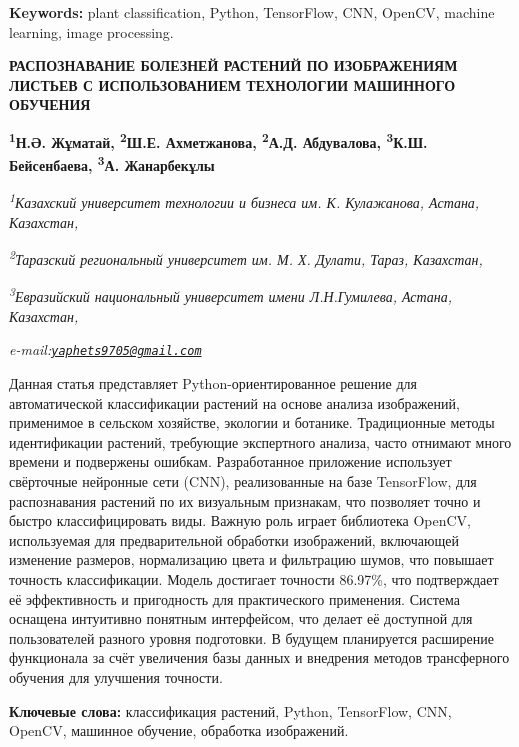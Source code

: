{\bfseries Keywords:} plant classification, Python, TensorFlow, CNN,
OpenCV, machine learning, image processing.

\begin{articleheader}
{\bfseries РАСПОЗНАВАНИЕ БОЛЕЗНЕЙ РАСТЕНИЙ ПО ИЗОБРАЖЕНИЯМ ЛИСТЬЕВ С ИСПОЛЬЗОВАНИЕМ ТЕХНОЛОГИИ МАШИННОГО ОБУЧЕНИЯ}

{\bfseries
\textsuperscript{1}Н.Ә. Жұматай,
\textsuperscript{2}Ш.Е. Ахметжанова,
\textsuperscript{2}А.Д. Абдувалова,
\textsuperscript{3}К.Ш. Бейсенбаева,
\textsuperscript{3}А. Жанарбекұлы\textsuperscript{\envelope }}
\end{articleheader}

\begin{affiliation}
\emph{\textsuperscript{1}Казахский университет технологии и бизнеса им. К. Кулажанова, Астана, Казахстан,}

\emph{\textsuperscript{2}Таразский региональный университет им. М. Х. Дулати, Тараз, Казахстан,}

\emph{\textsuperscript{3}Евразийский национальный университет имени Л.Н.Гумилева, Астана, Казахстан,}

\emph{e-mail:\href{mailto:yaphets9705@gmail.com}{\nolinkurl{yaphets9705@gmail.com}}}
\end{affiliation}

Данная статья представляет Python-ориентированное решение для
автоматической классификации растений на основе анализа изображений,
применимое в сельском хозяйстве, экологии и ботанике. Традиционные
методы идентификации растений, требующие экспертного анализа, часто
отнимают много времени и подвержены ошибкам. Разработанное приложение
использует свёрточные нейронные сети (CNN), реализованные на базе
TensorFlow, для распознавания растений по их визуальным признакам, что
позволяет точно и быстро классифицировать виды. Важную роль играет
библиотека OpenCV, используемая для предварительной обработки
изображений, включающей изменение размеров, нормализацию цвета и
фильтрацию шумов, что повышает точность классификации. Модель достигает
точности 86.97\%, что подтверждает её эффективность и пригодность для
практического применения. Система оснащена интуитивно понятным
интерфейсом, что делает её доступной для пользователей разного уровня
подготовки. В будущем планируется расширение функционала за счёт
увеличения базы данных и внедрения методов трансферного обучения для
улучшения точности.

{\bfseries Ключевые слова:} классификация растений, Python, TensorFlow,
CNN, OpenCV, машинное обучение, обработка изображений.

